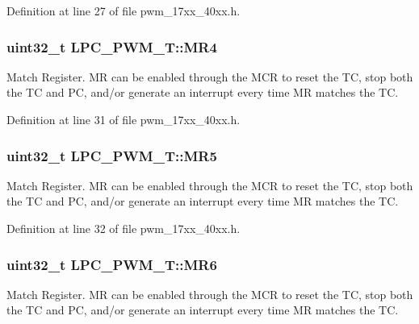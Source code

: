 Definition at line 27 of file pwm\+\_\+17xx\+\_\+40xx.\+h.

\subsubsection[{\texorpdfstring{M\+R4}{MR4}}]{ uint32\+\_\+t L\+P\+C\+\_\+\+P\+W\+M\+\_\+\+T\+::\+M\+R4}\hypertarget{structLPC__PWM__T_a8c92099279bc1cf0c6f8c1911c23d2ea}{}\label{structLPC__PWM__T_a8c92099279bc1cf0c6f8c1911c23d2ea}
Match Register. MR can be enabled through the M\+CR to reset the TC, stop both the TC and PC, and/or generate an interrupt every time MR matches the TC. 

Definition at line 31 of file pwm\+\_\+17xx\+\_\+40xx.\+h.

\subsubsection[{\texorpdfstring{M\+R5}{MR5}}]{ uint32\+\_\+t L\+P\+C\+\_\+\+P\+W\+M\+\_\+\+T\+::\+M\+R5}\hypertarget{structLPC__PWM__T_aefea3255575d4e9dd6d534fb080f8e2a}{}\label{structLPC__PWM__T_aefea3255575d4e9dd6d534fb080f8e2a}
Match Register. MR can be enabled through the M\+CR to reset the TC, stop both the TC and PC, and/or generate an interrupt every time MR matches the TC. 

Definition at line 32 of file pwm\+\_\+17xx\+\_\+40xx.\+h.

\subsubsection[{\texorpdfstring{M\+R6}{MR6}}]{ uint32\+\_\+t L\+P\+C\+\_\+\+P\+W\+M\+\_\+\+T\+::\+M\+R6}\hypertarget{structLPC__PWM__T_ab794c0c2f7bed133dde9a1d033bc22f9}{}\label{structLPC__PWM__T_ab794c0c2f7bed133dde9a1d033bc22f9}
Match Register. MR can be enabled through the M\+CR to reset the TC, stop both the TC and PC, and/or generate an interrupt every time MR matches the TC. 

